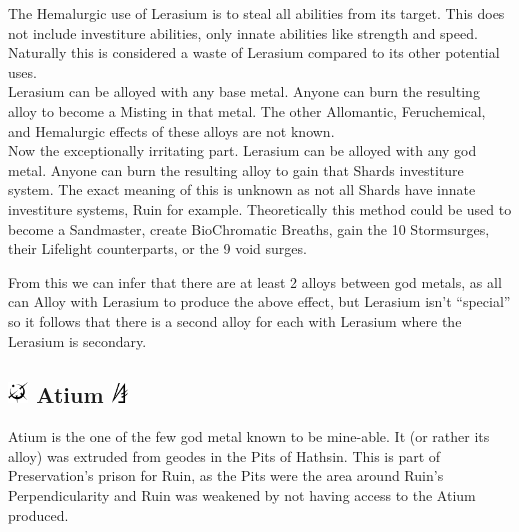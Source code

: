 \documentclass[conference]{IEEEtran}
\begin{document}
The Hemalurgic use of Lerasium is to steal all abilities from its target.\cite{HE-TB} This does not include investiture abilities, only innate abilities like strength and speed.\cite{PvAvI}\cite{HE-le}  Naturally this is considered a waste of Lerasium compared to its other potential uses.\cite{leras-waste}\\

Lerasium can be alloyed with any base metal.\cite{shard-alloy}  Anyone can burn the resulting alloy to become a Misting in that metal.\cite{lerassting}  The other Allomantic, Feruchemical, and Hemalurgic effects of these alloys are not known.\\

Now the exceptionally irritating part.  Lerasium can be alloyed with any god metal.  Anyone can burn the resulting alloy to gain that Shards investiture system.\cite{leras-alloy}  The exact meaning of this is unknown as not all Shards have innate investiture systems, Ruin for example.  Theoretically this method could be used to become a Sandmaster, create BioChromatic Breaths, gain the 10 Stormsurges, their Lifelight counterparts, or the 9 void surges.

From this we can infer that there are at least 2 alloys between god metals, as all can Alloy with Lerasium to produce the above effect, but Lerasium isn't ``special'' so it follows that there is a second alloy for each with Lerasium where the Lerasium is secondary.  

\subsection*{\includegraphics[height=1em]{images/Atium.png}  \textbf{Atium} \cite{SH-PT1-CH2} \includegraphics[height=1em]{images/Atium_(Feruchemy).png}}
Atium is the one of the few god metal known to be mine-able.  It (or rather its alloy\cite{HE-TB}\cite{atium-electrum}) was extruded from geodes in the Pits of Hathsin.\cite{TFE-CH13}  This is part of Preservation's prison for Ruin,\cite{WoF} as the Pits were the area around Ruin's Perpendicularity\cite{SH-PT2-CH1} and Ruin was weakened by not having access to the Atium produced.\cite{HoA}
 
\end{document}
